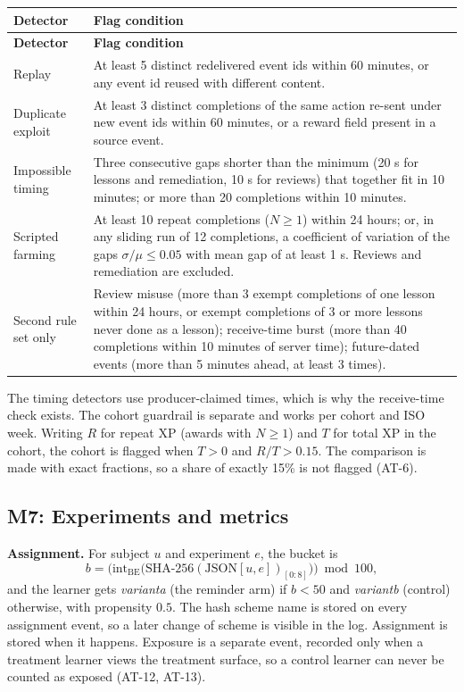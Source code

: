 \documentclass[11pt,a4paper]{article}
\newcommand{\hdr}[1]{\textbf{\color{white}\sffamily\small #1}}
\renewcommand{\_}{\textunderscore\allowbreak{}}
\begin{document}
\begin{xltabular}{\textwidth}{@{}L{2.9cm} Y@{}}
 \hdr{Detector} & \hdr{Flag condition} \\
\endfirsthead
{} \hdr{Detector} & \hdr{Flag condition} \\
\endhead
{} Replay & At least 5 distinct redelivered event ids within 60 minutes, or any event id reused with different content. \\
Duplicate exploit & At least 3 distinct completions of the same action re-sent under new event ids within 60 minutes, or a reward field present in a source event. \\
 Impossible timing & Three consecutive gaps shorter than the minimum (20 s for lessons and remediation, 10 s for reviews) that together fit in 10 minutes; or more than 20 completions within 10 minutes. \\
Scripted farming & At least 10 repeat completions ($N\ge1$) within 24 hours; or, in any sliding run of 12 completions, a coefficient of variation of the gaps $\sigma/\mu \le 0.05$ with mean gap of at least 1 s. Reviews and remediation are excluded. \\
 Second rule set only & Review misuse (more than 3 exempt completions of one lesson within 24 hours, or exempt completions of 3 or more lessons never done as a lesson); receive-time burst (more than 40 completions within 10 minutes of server time); future-dated events (more than 5 minutes ahead, at least 3 times). \\
\end{xltabular}

The timing detectors use producer-claimed times, which is why the receive-time check exists. The cohort guardrail is separate and works per cohort and ISO week. Writing $R$ for repeat XP (awards with $N \ge 1$) and $T$ for total XP in the cohort, the cohort is flagged when $T>0$ and $R/T>0.15$. The comparison is made with exact fractions, so a share of exactly 15\% is not flagged (AT-6).

\subsection{M7: Experiments and metrics}

\textbf{Assignment.} For subject $u$ and experiment $e$, the bucket is
\[
b=\Big(\text{int}_{\text{BE}}\big(\text{SHA-256}(\text{JSON}[u,e])_{[0:8]}\big)\Big) \bmod 100,
\]
and the learner gets \emph{variant\_a} (the reminder arm) if $b<50$ and \emph{variant\_b} (control) otherwise, with propensity $0.5$. The hash scheme name  is stored on every assignment event, so a later change of scheme is visible in the log. Assignment is stored when it happens. Exposure is a separate event, recorded only when a treatment learner views the treatment surface, so a control learner can never be counted as exposed (AT-12, AT-13).
\end{document}
